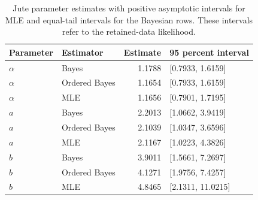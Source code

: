\begin{table}[htbp]
\centering
\caption{Jute parameter estimates with positive asymptotic intervals for MLE and equal-tail intervals for the Bayesian rows. These intervals refer to the retained-data likelihood.}\label{tab:parameter-intervals}
\small
\begin{tabular}{llrl}
\toprule
Parameter & Estimator & Estimate & 95 percent interval \\
\midrule
$\alpha$ & Bayes & 1.1788 & [0.7933, 1.6159] \\
$\alpha$ & Ordered Bayes & 1.1654 & [0.7933, 1.6159] \\
$\alpha$ & MLE & 1.1656 & [0.7901, 1.7195] \\
$a$ & Bayes & 2.2013 & [1.0662, 3.9419] \\
$a$ & Ordered Bayes & 2.1039 & [1.0347, 3.6596] \\
$a$ & MLE & 2.1167 & [1.0223, 4.3826] \\
$b$ & Bayes & 3.9011 & [1.5661, 7.2697] \\
$b$ & Ordered Bayes & 4.1271 & [1.9756, 7.4257] \\
$b$ & MLE & 4.8465 & [2.1311, 11.0215] \\
\bottomrule
\end{tabular}
\end{table}
